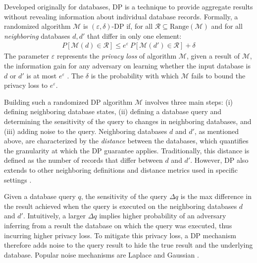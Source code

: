 Developed originally for databases, DP is a technique to provide aggregate
results without revealing information about individual database
records.
%
Formally, a randomized algorithm $\mathcal{M}$ is $(\varepsilon, \delta)$-DP
if, for all $\mathcal{R} \subseteq \textrm{Range}(\mathcal{M})$ and for all
{\em neighboring} databases $d, d'$ that differ in only one element:
\begin{align}
\label{eq:dp}
P[\mathcal{M}(d)\in \mathcal{R}] \leq e^{\varepsilon}~P[\mathcal{M}(d') \in
\mathcal{R}] + \delta
\end{align}
The parameter $\varepsilon$ represents the {\em privacy loss} of algorithm
$\mathcal{M}$, \ie given a
result of $\mathcal{M}$, the information gain for any adversary on learning
whether the input database is $d$ or $d'$ is at most $e^{\varepsilon}$
\cite{kasiviswanathan2014semantics}.
The $\delta$ is the probability with which $\mathcal{M}$ fails to bound the
privacy loss to $e^{\varepsilon}$.

Building such a randomized DP algorithm $\mathcal{M}$ involves three
main steps: (i) defining neighboring database states, (ii) defining a database
query and determining the sensitivity of the query to changes in neighboring
databases, and (iii) adding noise to the query.
Neighboring databases $d$ and $d'$, as mentioned above, are characterized by the
{\em distance} between the databases, which quantifies the granularity at which
the DP guarantee applies.
Traditionally, this distance is defined as the number of
records that differ between $d$ and $d'$. However, DP also extends to other
neighboring definitions and distance metrics used in specific settings
\cite{chatzikokolakis2013broadening, lecuyer2019certified}.

Given a database query $q$, the sensitivity of the query $\Delta q$ is the max
difference in the result achieved when the query is executed on the neighboring
databases $d$ and $d'$. Intuitively, a larger $\Delta q$ implies higher
probability of an adversary inferring from a result the database on which the
query was executed, thus incurring higher privacy loss.
%
To mitigate this privacy loss, a DP mechanism therefore adds noise to
the query result to hide the true result and the underlying database. Popular
noise mechanisms are Laplace \cite[\S3.3]{dwork2014algorithmic} and Gaussian
\cite{dong2022gaussian}.

